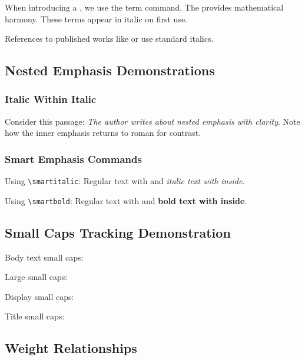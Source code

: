 \documentclass[11pt,a4paper]{article}
\begin{document}
When introducing a , we use the term command. The  provides mathematical harmony. These terms appear in italic on first use.

References to published works like  or  use standard italics.

\subsection{Nested Emphasis Demonstrations}

\subsubsection{Italic Within Italic}

Consider this passage: \emph{The author writes about \emph{nested emphasis} with clarity}. Note how the inner emphasis returns to roman for contrast.

\subsubsection{Smart Emphasis Commands}

Using \texttt{\textbackslash smartitalic}: Regular text with  and \emph{italic text with  inside}.

Using \texttt{\textbackslash smartbold}: Regular text with  and \textbf{bold text with  inside}.

\subsection{Small Caps Tracking Demonstration}


Body text small caps: 

{\large Large small caps: }

{\Large Display small caps: }

{\LARGE Title small caps: }

\subsection{Weight Relationships}
\end{document}
